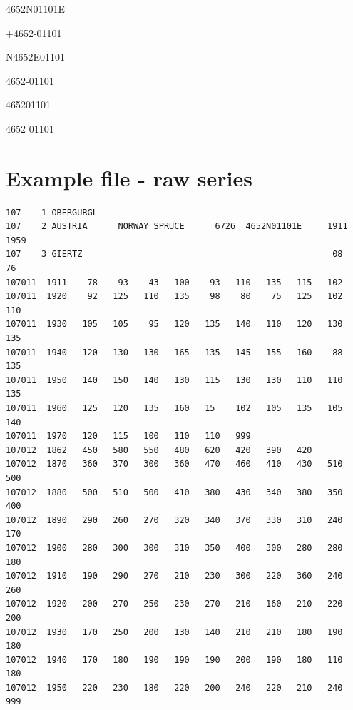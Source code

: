 \begin{itemize*}
\begin{multicols}{2}
\begin{itemize*}
\item  4652N01101E
\item  +4652-01101
\item  N4652E01101
\item  4652-01101
\item  465201101
\item  4652 01101 
\end{itemize*}
\end{multicols}

\end{itemize*}


\section{Example file - raw series}
\begin{lstlisting}
107    1 OBERGURGL
107    2 AUSTRIA      NORWAY SPRUCE      6726  4652N01101E     1911 1959
107    3 GIERTZ                                                 08    76
107011  1911    78    93    43   100    93   110   135   115   102
107011  1920    92   125   110   135    98    80    75   125   102   110
107011  1930   105   105    95   120   135   140   110   120   130   135
107011  1940   120   130   130   165   135   145   155   160    88   135
107011  1950   140   150   140   130   115   130   130   110   110   135
107011  1960   125   120   135   160   15    102   105   135   105   140
107011  1970   120   115   100   110   110   999
107012  1862   450   580   550   480   620   420   390   420
107012  1870   360   370   300   360   470   460   410   430   510   500
107012  1880   500   510   500   410   380   430   340   380   350   400
107012  1890   290   260   270   320   340   370   330   310   240   170
107012  1900   280   300   300   310   350   400   300   280   280   180
107012  1910   190   290   270   210   230   300   220   360   240   260
107012  1920   200   270   250   230   270   210   160   210   220   200
107012  1930   170   250   200   130   140   210   210   180   190   180
107012  1940   170   180   190   190   190   200   190   180   110   180
107012  1950   220   230   180   220   200   240   220   210   240   999
\end{lstlisting}


